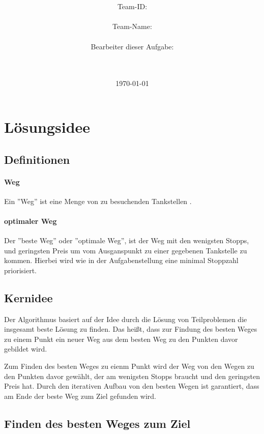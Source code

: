 \documentclass[a4paper,10pt,ngerman]{scrartcl}
\title{\textbf{\Huge\Aufgabe}}
\author{\LARGE Team-ID: \LARGE \TeamID \\\\
        \LARGE Team-Name: \LARGE \TeamName \\\\
        \LARGE Bearbeiter dieser Aufgabe: \\ 
        \LARGE \Namen\\\\}
\date{\LARGE\today}
\begin{document}
\maketitle
\tableofcontents

\vspace{0.5cm}

\section{Lösungsidee}

\subsection{Definitionen}

\paragraph{Weg}

Ein ''Weg'' ist eine Menge von zu besuchenden Tankstellen .

\paragraph{optimaler Weg}

Der ''beste Weg'' oder ''optimale Weg'', ist der Weg mit den wenigsten Stopps, und geringsten Preis um vom Ausganspunkt zu einer gegebenen Tankstelle zu kommen.
Hierbei wird wie in der Aufgabenstellung eine minimal Stoppzahl priorisiert.

\subsection{Kernidee}

Der Algorithmus basiert auf der Idee durch die Lösung von Teilproblemen die insgesamt beste Lösung zu finden.
Das heißt, dass zur Findung des besten Weges zu einem Punkt ein neuer Weg aus dem besten Weg zu den Punkten davor gebildet wird.
 
Zum Finden des besten Weges zu eienm Punkt wird der Weg von den Wegen zu den Punkten davor gewählt, der am wenigsten Stopps braucht und den geringsten Preis hat.
Durch den iterativen Aufbau von den besten Wegen ist garantiert, dass am Ende der beste Weg zum Ziel gefunden wird.

\subsection{Finden des besten Weges zum Ziel}
\end{document}
